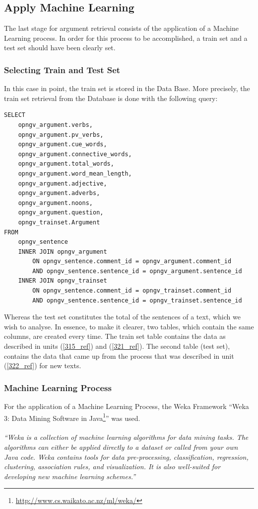 \subsection{Apply Machine Learning}\label{323_ref}
The last stage for argument retrieval consists of the application of a Machine Learning process. In order for this process to be accomplished, a train set and a test set should have been clearly set.

\subsubsection{Selecting Train and Test Set}\label{3231_ref}
In this case in point, the train set is stored in the Data Base. More precisely, the train set retrieval from the Database is done with the following query:
\newpage
\lstset{language=SQL}
\begin{lstlisting}[frame=single, basicstyle=\small]
SELECT
	opngv_argument.verbs,
	opngv_argument.pv_verbs,
	opngv_argument.cue_words,
	opngv_argument.connective_words,
	opngv_argument.total_words,
	opngv_argument.word_mean_length,
	opngv_argument.adjective,
	opngv_argument.adverbs,
	opngv_argument.noons,
	opngv_argument.question,
	opngv_trainset.Argument
FROM
	opngv_sentence
	INNER JOIN opngv_argument
		ON opngv_sentence.comment_id = opngv_argument.comment_id
	 	AND opngv_sentence.sentence_id = opngv_argument.sentence_id
	INNER JOIN opngv_trainset
	 	ON opngv_sentence.comment_id = opngv_trainset.comment_id
	 	AND opngv_sentence.sentence_id = opngv_trainset.sentence_id
\end{lstlisting}
Whereas the test set constitutes the total of the sentences of a text, which we wish to analyse. In essence, to make it clearer, two tables, which contain the same columns, are created every time. The train set table contains the data as described in units (\ref{315_ref}) and (\ref{321_ref}). The second table (test set), contains the data that came up from the process that was described in unit (\ref{322_ref}) for new texts.

\subsubsection{Machine Learning Process}\label{3232_ref}
For the application of a Machine Learning Process, the Weka Framework ``Weka 3: Data Mining Software in Java\footnote{\url{http://www.cs.waikato.ac.nz/ml/weka/}}'' was used.\\
\\
\textit{“Weka is a collection of machine learning algorithms for data mining tasks. The algorithms can either be applied directly to a dataset or called from your own Java code. Weka contains tools for data pre-processing, classification, regression, clustering, association rules, and visualization. It is also well-suited for developing new machine learning schemes.”}

